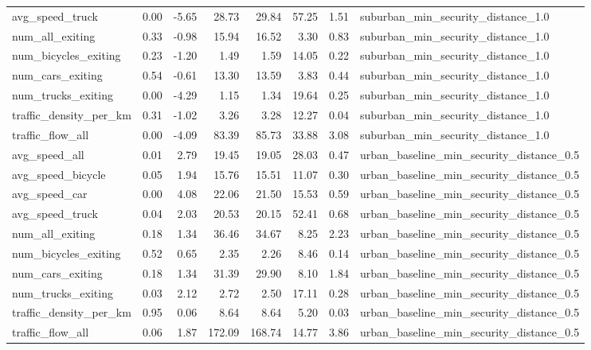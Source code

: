 \begin{table}[ht]
\begin{tabular}{lrrrrrrl}
  avg\_speed\_truck & 0.00 & -5.65 & 28.73 & 29.84 & 57.25 & 1.51 & suburban\_min\_security\_distance\_1.0 \\ 
  num\_all\_exiting & 0.33 & -0.98 & 15.94 & 16.52 & 3.30 & 0.83 & suburban\_min\_security\_distance\_1.0 \\ 
  num\_bicycles\_exiting & 0.23 & -1.20 & 1.49 & 1.59 & 14.05 & 0.22 & suburban\_min\_security\_distance\_1.0 \\ 
  num\_cars\_exiting & 0.54 & -0.61 & 13.30 & 13.59 & 3.83 & 0.44 & suburban\_min\_security\_distance\_1.0 \\ 
  num\_trucks\_exiting & 0.00 & -4.29 & 1.15 & 1.34 & 19.64 & 0.25 & suburban\_min\_security\_distance\_1.0 \\ 
  traffic\_density\_per\_km & 0.31 & -1.02 & 3.26 & 3.28 & 12.27 & 0.04 & suburban\_min\_security\_distance\_1.0 \\ 
  traffic\_flow\_all & 0.00 & -4.09 & 83.39 & 85.73 & 33.88 & 3.08 & suburban\_min\_security\_distance\_1.0 \\ 
  avg\_speed\_all & 0.01 & 2.79 & 19.45 & 19.05 & 28.03 & 0.47 & urban\_baseline\_min\_security\_distance\_0.5 \\ 
  avg\_speed\_bicycle & 0.05 & 1.94 & 15.76 & 15.51 & 11.07 & 0.30 & urban\_baseline\_min\_security\_distance\_0.5 \\ 
  avg\_speed\_car & 0.00 & 4.08 & 22.06 & 21.50 & 15.53 & 0.59 & urban\_baseline\_min\_security\_distance\_0.5 \\ 
  avg\_speed\_truck & 0.04 & 2.03 & 20.53 & 20.15 & 52.41 & 0.68 & urban\_baseline\_min\_security\_distance\_0.5 \\ 
  num\_all\_exiting & 0.18 & 1.34 & 36.46 & 34.67 & 8.25 & 2.23 & urban\_baseline\_min\_security\_distance\_0.5 \\ 
  num\_bicycles\_exiting & 0.52 & 0.65 & 2.35 & 2.26 & 8.46 & 0.14 & urban\_baseline\_min\_security\_distance\_0.5 \\ 
  num\_cars\_exiting & 0.18 & 1.34 & 31.39 & 29.90 & 8.10 & 1.84 & urban\_baseline\_min\_security\_distance\_0.5 \\ 
  num\_trucks\_exiting & 0.03 & 2.12 & 2.72 & 2.50 & 17.11 & 0.28 & urban\_baseline\_min\_security\_distance\_0.5 \\ 
  traffic\_density\_per\_km & 0.95 & 0.06 & 8.64 & 8.64 & 5.20 & 0.03 & urban\_baseline\_min\_security\_distance\_0.5 \\ 
  traffic\_flow\_all & 0.06 & 1.87 & 172.09 & 168.74 & 14.77 & 3.86 & urban\_baseline\_min\_security\_distance\_0.5 \\ 

\end{tabular}
\end{table}
